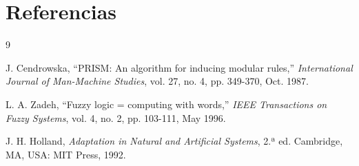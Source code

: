 \documentclass[12pt,a4paper]{article}
\begin{document}

\section{Referencias}

\begin{thebibliography}{9}

J. Cendrowska, ``PRISM: An algorithm for inducing modular rules,''
\textit{International Journal of Man-Machine Studies}, vol. 27, no. 4,
pp. 349-370, Oct. 1987.

L. A. Zadeh, ``Fuzzy logic = computing with words,'' \textit{IEEE
Transactions on Fuzzy Systems}, vol. 4, no. 2, pp. 103-111, May 1996.

J. H. Holland, \textit{Adaptation in Natural and Artificial Systems},
2.ª ed. Cambridge, MA, USA: MIT Press, 1992.

\end{thebibliography}
\end{document}
